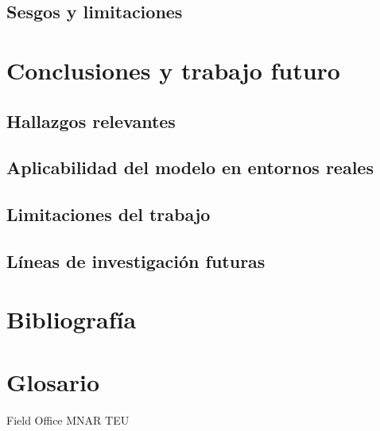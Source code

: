 \documentclass{article}
\begin{document}
	\subsection{Sesgos y limitaciones}


\section{Conclusiones y trabajo futuro}

	\subsection{Hallazgos relevantes}
	
	\subsection{Aplicabilidad del modelo en entornos reales}
	
	\subsection{Limitaciones del trabajo}
	
	\subsection{Líneas de investigación futuras}

\section{Bibliografía}

\section{Glosario}
Field Office
MNAR
TEU
\end{document}
